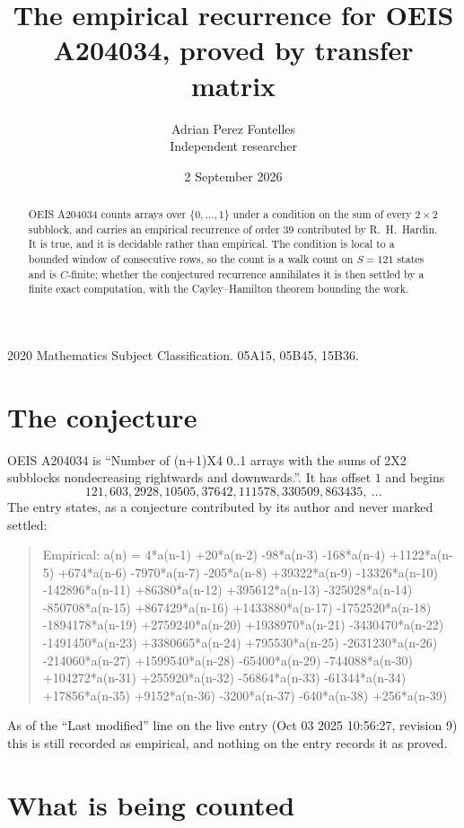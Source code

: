 \documentclass[11pt,a4paper]{article}
\title{The empirical recurrence for OEIS A204034, proved by transfer matrix}
\author{Adrian Perez Fontelles\\ \small Independent researcher}
\date{2 September 2026}
\theoremstyle{plain}
\theoremstyle{definition}
\begin{document}
\maketitle

\begin{abstract}
OEIS A204034 counts arrays over $\{0,\dots,1\}$ under a condition on the sum of every
$2\times2$ subblock, and carries an empirical recurrence of order $39$ contributed by
R.~H.~Hardin. It is true, and it is decidable rather than empirical. The condition is local to
a bounded window of consecutive rows, so the count is a walk count on $S=121$ states and is
$C$-finite; whether the conjectured recurrence annihilates it is then settled by a finite exact
computation, with the Cayley--Hamilton theorem bounding the work.
\end{abstract}

\noindent\small 2020 Mathematics Subject Classification. 05A15, 05B45, 15B36.\normalsize

\section{The conjecture}

OEIS A204034 is ``Number of (n+1)X4 0..1 arrays with the sums of 2X2 subblocks nondecreasing rightwards and downwards.''. It has offset $1$ and begins
\[
121, 603, 2928, 10505, 37642, 111578, 330509, 863435,\ \dots
\]
The entry states, as a conjecture contributed by its author and never marked settled:
\begin{quote}
Empirical: a(n) = 4*a(n-1) +20*a(n-2) -98*a(n-3) -168*a(n-4) +1122*a(n-5) +674*a(n-6) -7970*a(n-7) -205*a(n-8) +39322*a(n-9) -13326*a(n-10) -142896*a(n-11) +86380*a(n-12) +395612*a(n-13) -325028*a(n-14) -850708*a(n-15) +867429*a(n-16) +1433880*a(n-17) -1752520*a(n-18) -1894178*a(n-19) +2759240*a(n-20) +1938970*a(n-21) -3430470*a(n-22) -1491450*a(n-23) +3380665*a(n-24) +795530*a(n-25) -2631230*a(n-26) -214060*a(n-27) +1599540*a(n-28) -65400*a(n-29) -744088*a(n-30) +104272*a(n-31) +255920*a(n-32) -56864*a(n-33) -61344*a(n-34) +17856*a(n-35) +9152*a(n-36) -3200*a(n-37) -640*a(n-38) +256*a(n-39)
\end{quote}
As of the ``Last modified'' line on the live entry (Oct 03 2025 10:56:27, revision 9) this is still
recorded as empirical, and nothing on the entry records it as proved.

\section{What is being counted}
\end{document}
